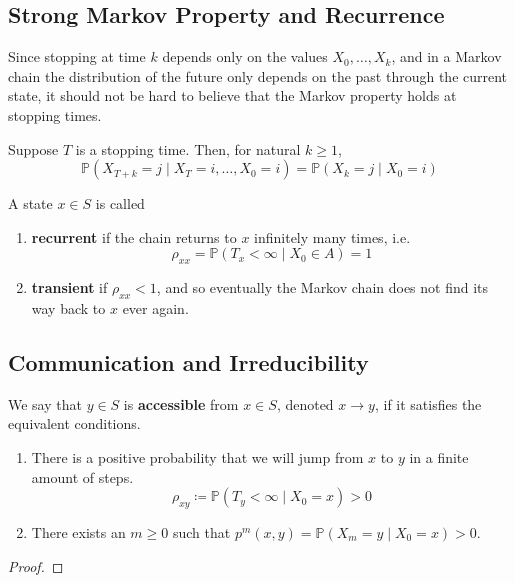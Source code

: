 \subsection{Strong Markov Property and Recurrence}

	Since stopping at time $k$ depends only on the values $X_0, \ldots, X_k$, and in a Markov chain the distribution of the future only depends on the past through the current state, it should not be hard to believe that the Markov property holds at stopping times. 

	\begin{theorem}
		\label{thm:strong-markov-property}
		Suppose $T$ is a stopping time. Then, for natural $k \geq 1$, 
			\begin{equation}
				\mathbb{P}(X_{T + k} = j \mid X_T = i, \ldots, X_0 = i) = \mathbb{P}(X_k = j \mid X_0 = i)
			\end{equation}
	\end{theorem}

	\begin{definition}
		\label{def:recurrence-transience}
		A state $x \in S$ is called 
		\begin{enumerate}
		  \item \textbf{recurrent} if the chain returns to $x$ infinitely many times, i.e.
				\begin{equation}
					\rho_{xx} = \mathbb{P}(T_x < \infty \mid X_0 \in A) = 1
				\end{equation}

			\item \textbf{transient} if $\rho_{xx} < 1$, and so eventually the Markov chain does not find its way back to $x$ ever again. 
		\end{enumerate}
	\end{definition}

\subsection{Communication and Irreducibility}

	\begin{definition}[Accessibility]
		\label{def:accessibility}
		We say that $y \in S$ is \textbf{accessible} from $x \in S$, denoted $x \rightarrow y$, if it satisfies the equivalent conditions. 
		\begin{enumerate}
		  \item There is a positive probability that we will jump from $x$ to $y$ in a finite amount of steps. 
				\begin{equation}
					\rho_{xy} \coloneqq \mathbb{P}(T_y < \infty \mid X_0 = x) > 0
				\end{equation}

			\item There exists an $m \geq 0$ such that $p^m (x, y) = \mathbb{P}(X_m = y \mid X_0 = x) > 0$. 
		\end{enumerate}
	\end{definition}
	\begin{proof}
	  
	\end{proof}

